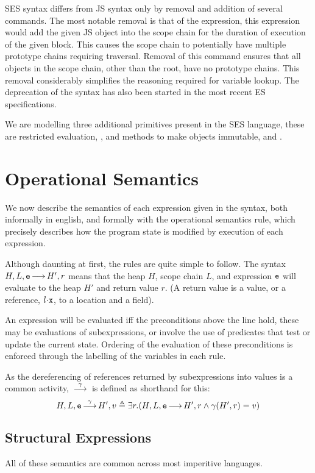 \documentclass[a4paper,notitlepage]{report}
\begin{document}
  SES syntax differs from JS syntax only by removal and addition of several
  commands. The most notable removal is that of the  expression, this
  expression would add the given JS object into the scope chain for the duration
  of execution of the given block. This causes the scope chain to potentially
  have multiple prototype chains requiring traversal. Removal of this command
  ensures that all objects in the scope chain, other than the root, have no
  prototype chains. This removal considerably simplifies the reasoning required
  for variable lookup. The deprecation of the  syntax has also been
  started in the most recent ES specifications.

  We are modelling three additional primitives present in the SES language,
  these are restricted evaluation, , and methods to make objects
  immutable,  and .

  \section{Operational Semantics}

  We now describe the semantics of each expression given in the syntax, both
  informally in english, and formally with the operational semantics rule, which
  precisely describes how the program state is modified by execution of each
  expression.

  Although daunting at first, the rules are quite simple to follow. The syntax
  $H,L,\mathtt{e} {\,\longrightarrow\,} H',r$ means that the heap $H$, scope chain $L$, and
  expression $\mathtt{e}$ will evaluate to the heap $H'$ and return value $r$. (A
  return value is a value, or a reference, $\fld{l}{\js{x}}$, to a location and
  a field).

  An expression will be evaluated iff the preconditions above the line hold,
  these may be evaluations of subexpressions, or involve the use of predicates
  that test or update the current state. 
  Ordering of the evaluation of these preconditions is enforced through the
  labelling of the variables in each rule.

  As the dereferencing of references returned by subexpressions into values is a
  common activity, $\overset{\gamma}{{\,\longrightarrow\,}}$ is defined as shorthand for this:
  \[ H,L,\mathtt{e} \overset{\gamma}{{\,\longrightarrow\,}} H',v \triangleq \exists r. (H,L,\mathtt{e} {\,\longrightarrow\,} H',r
  \wedge \gamma(H',r) = v) \]

  \subsection{Structural Expressions}
  All of these semantics are common across most imperitive languages.
\end{document}
